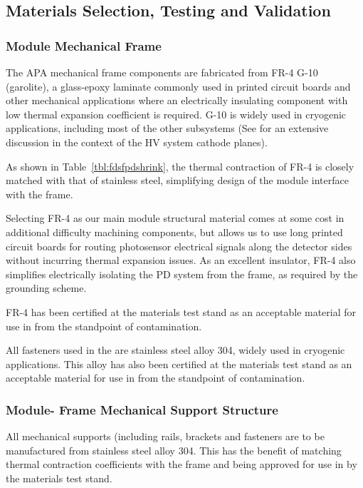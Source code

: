 \subsection{Materials Selection, Testing and Validation}

\subsubsection{ Module Mechanical Frame}

The APA mechanical frame components are fabricated from FR-4 G-10 (garolite), a glass-epoxy laminate commonly used in printed circuit boards and other mechanical applications where an electrically insulating component with low thermal expansion coefficient is required.  G-10 is widely used in cryogenic applications, including most of the other  subsystems (See  for an extensive discussion in the context of the HV system cathode planes). 

As shown in Table~\ref{tbl:fdsfpdshrink}, the thermal contraction of FR-4 is closely matched with that of stainless steel, simplifying design of the module interface with the  frame.

Selecting FR-4 as our main module structural material comes at some cost in additional difficulty machining components, but allows us to use long printed circuit boards for routing photosensor electrical signals along the detector sides without incurring thermal expansion issues.  As an excellent insulator, FR-4 also simplifies electrically isolating the PD system from the  frame, as required by the  grounding scheme.

FR-4 has been certified at the  materials test stand as an acceptable material for use in  from the standpoint of  contamination.

All fasteners used in the  are stainless steel alloy 304, widely used in cryogenic applications.  This alloy has also been certified at the  materials test stand as an acceptable material for use in  from the standpoint of  contamination.

\subsubsection{ Module- Frame Mechanical Support Structure}

All  mechanical supports (including rails, brackets and fasteners are to be manufactured from stainless steel alloy 304.  This has the benefit of matching thermal contraction coefficients with the  frame and being approved for use in  by the materials test stand.

